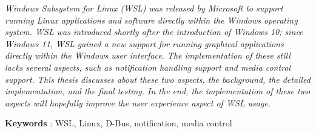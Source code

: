 \textit{
Windows Subsystem for Linux (WSL) was released by Microsoft to support running Linux applications and software directly within the Windows operating system. WSL was introduced shortly after the introduction of Windows 10; since Windows 11, WSL gained a new support for running graphical applications directly within the Windows user interface. The implementation of these still lacks several aspects, such as notification handling support and media control support. This thesis discusses about these two aspects, the background, the detailed implementation, and the final testing. In the end, the implementation of these two aspects will hopefully improve the user experience aspect of WSL usage.
}

\noindent\textbf{Keywords} : WSL, Linux, D-Bus, notification, media control
